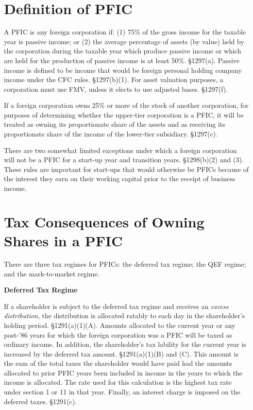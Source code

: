 	\section{Definition of PFIC}
	
	     A PFIC is any foreign corporation if: (1) 75\% of the gross income for the taxable year is passive income; or (2) the average percentage of assets (by value) held by the corporation during the taxable year which produce passive income or which are held for the production of passive income is at least 50\%.  \S1297(a).  Passive income is defined to be income that would be foreign personal holding company income under the CFC rules.  \S1297(b)(1).  For asset valuation purposes, a corporation must use FMV, unless it elects to use adjusted bases.  \S 1297(f).
	     
	     If a foreign corporation owns 25\% or more of the stock of another corporation, for purposes of determining whether the upper-tier corporation is a PFIC, it will be treated as owning its proportionate share of the assets and as receiving its proportionate share of the income of the lower-tier subsidiary.  \S1297(c).
	     
	     There are two somewhat limited exceptions under which a foreign corporation will not be a PFIC for a start-up year and transition years.  \S1298(b)(2) and (3).  These rules are important for start-ups that would otherwise be PFICs because of the interest they earn on their working capital prior to the receipt of business income.  	
	     
	     \section{Tax Consequences of Owning Shares in a PFIC}
	     
	     There are three tax regimes for PFICs: the deferred tax regime; the QEF regime; and the mark-to-market regime.
	     \begin{center}
	     \textbf{Deferred Tax Regime}
	     \end{center}
	     If a shareholder is subject to the deferred tax regime and receives an \emph{excess distribution}, the distribution is allocated ratably to each day in the shareholder's holding period.  \S1291(a)(1)(A).  Amounts allocated to the current year or any post-'86 years for which the foreign corporation was a PFIC will be taxed as ordinary income.  In addition, the shareholder's tax lability for the current year is increased by the deferred tax amount.  \S1291(a)(1)(B) and (C).  This amount is the sum of the total taxes the shareholder would have paid had the amounts allocated to prior PFIC years been included in income in the years to which the income is allocated.  The rate used for this calculation is the highest tax rate under section 1 or 11 in that year.  Finally, an interest charge is imposed on the deferred taxes.  \S1291(c).
	     
